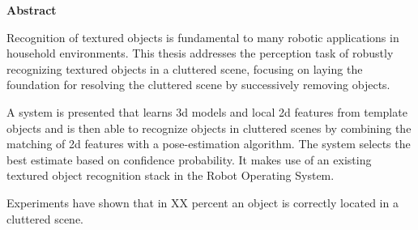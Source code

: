 

\clearemptydoublepage
{}
{}	





\vspace*{2cm}
\begin{center}
{\Large \bf Abstract}
\end{center}
\vspace{1cm}

Recognition of textured objects is fundamental to many robotic applications in
household environments. This thesis addresses the perception task of robustly
recognizing textured objects in a cluttered scene, focusing on laying the
foundation for resolving the cluttered scene by successively removing objects.

A system is presented that learns 3d models and local 2d features from template
objects and is then able to recognize objects in cluttered scenes by combining
the matching of 2d features with a pose-estimation algorithm. The system
selects the best estimate based on confidence probability. It makes use of an
existing textured object recognition stack in the Robot Operating System.

Experiments have shown that in XX percent an object is correctly located in 
a cluttered scene.

